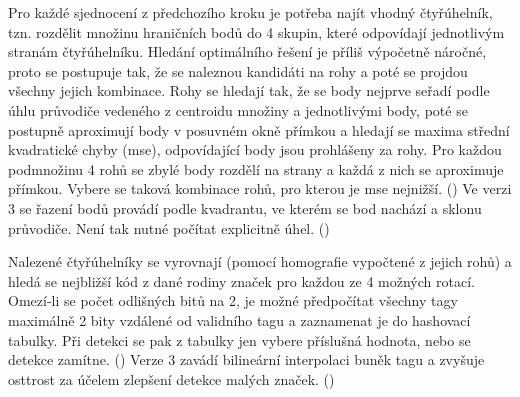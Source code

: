   Pro každé sjednocení z předchozího kroku je potřeba najít vhodný čtyřúhelník, tzn. rozdělit množinu hraničních bodů do 4 skupin, které odpovídají jednotlivým stranám čtyřúhelníku. Hledání optimálního řešení je příliš výpočetně náročné, proto se postupuje tak, že se naleznou kandidáti na rohy a poté se projdou všechny jejich kombinace. Rohy se hledají tak, že se body nejprve seřadí podle úhlu průvodiče vedeného z centroidu množiny a jednotlivými body, poté se postupně aproximují body v posuvném okně přímkou a hledají se maxima střední kvadratické chyby (\acrshort{mse}), odpovídající body jsou prohlášeny za rohy. Pro každou podmnožinu 4 rohů se zbylé body rozdělí na strany a každá z nich se aproximuje přímkou. Vybere se taková kombinace rohů, pro kterou je \acrshort{mse} nejnižší. (\cite{apriltag2}) Ve verzi 3 se řazení bodů provádí podle kvadrantu, ve kterém se bod nachází a sklonu průvodiče. Není tak nutné počítat explicitně úhel. (\cite{apriltag3})

  Nalezené čtyřúhelníky se vyrovnají (pomocí homografie vypočtené z jejich rohů) a hledá se nejbližší kód z dané rodiny značek pro každou ze 4 možných rotací. Omezí-li se počet odlišných bitů na 2, je možné předpočítat všechny tagy maximálně 2 bity vzdálené od validního tagu a zaznamenat je do hashovací tabulky. Při detekci se pak z tabulky jen vybere příslušná hodnota, nebo se detekce zamítne. (\cite{apriltag2}) Verze 3 zavádí bilineární interpolaci buněk tagu a zvyšuje osttrost za účelem zlepšení detekce malých značek. (\cite{apriltag3})